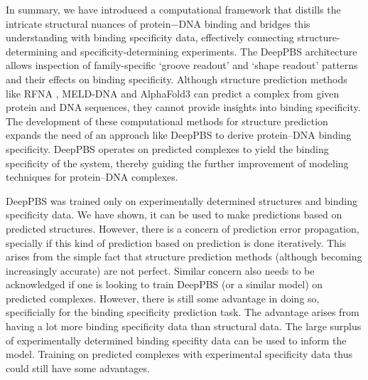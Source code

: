 \par
In summary, we have introduced a computational framework that distills the intricate structural nuances of protein$-$DNA binding and bridges this understanding with binding specificity data, effectively connecting structure-determining and specificity-determining experiments. The DeepPBS architecture allows inspection of family-specific ‘groove readout’ and ‘shape readout’ patterns and their effects on binding specificity. Although structure prediction methods like RFNA \citep{baek2024na}, MELD-DNA \citep{Esmaeeli2023} and AlphaFold3 \citep{Abramson2024} can predict a complex from given protein and DNA sequences, they cannot provide insights into binding specificity. The development of these computational methods for structure prediction expands the need of an approach like DeepPBS to derive protein–DNA binding specificity. DeepPBS operates on predicted complexes to yield the binding specificity of the system, thereby guiding the further improvement of modeling techniques for protein–DNA complexes. 
\par
DeepPBS was trained only on experimentally determined structures and binding specificity data. We have shown, it can be used to make predictions based on predicted structures. However, there is a concern of prediction error propagation, specially if this kind of prediction based on prediction is done iteratively. This arises from the simple fact that structure prediction methods (although becoming increasingly accurate) are not perfect. Similar concern also needs to be acknowledged if one is looking to train DeepPBS (or a similar model) on predicted complexes. However, there is still some advantage in doing so, specificially for the binding specificity prediction task. The advantage arises from having a lot more binding specificity data than structural data. The large surplus of experimentally determined binding specifity data can be used to inform the model. Training on predicted complexes with experimental specificity data thus could still have some advantages.

